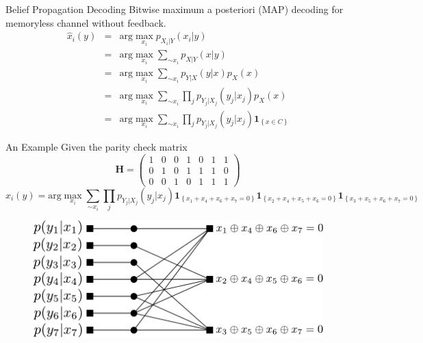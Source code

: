 \documentclass{beamer}
\begin{document}
  \begin{frame}{Belief Propagation Decoding}
  Bitwise maximum a posteriori (MAP) decoding for memoryless channel without feedback.
  \begin{eqnarray}
  \hat x_i( y) 	&=& \text{arg} \max_{x_i}p_{X_{i}|Y}(x_{i}| y) \label{eq:1}\\
		&=& \text{arg} \max_{x_i}\sum_{\sim x_i}p_{X|Y}( x| y) \label{eq:2}\\
		&=& \text{arg} \max_{x_i}\sum_{\sim x_i}p_{Y|X}( y| x)p_{X}( x) \label{eq:3}\\
		&=& \text{arg} \max_{x_i}\sum_{\sim x_i}\prod_{j}p_{Y_j|X_j}(y_j|x_j)p_{X}( x)\label{eq:4} \\
   		&=& \text{arg} \max_{x_i}\sum_{\sim x_i}\prod_{j}p_{Y_j|X_j}(y_j|x_j)\mathbf{1}_{\left\lbrace x\in C\right\rbrace} \label{eq:5}
  \end{eqnarray} 
  \end{frame}


  \begin{frame}{An Example}
   Given the parity check matrix
\begin{equation}
\label{H_matrix}
 \textbf{H} = 
 \left(
\begin{array}{ccccccc}
1 & 0 & 0 & 1 & 0 & 1 & 1  \\
0 & 1 & 0 & 1 & 1 & 1 & 0  \\
0 & 0 & 1 & 0 & 1 & 1 & 1 
\end{array}
\right)
\end{equation}
\fontsize{7pt}{7.2}\selectfont
\begin{equation}
\hat x_i(y) = \text{arg} \max_{x_i}\sum_{\sim x_i}\prod_{j}p_{Y_j|X_j}(y_j|x_j)\mathbf{1}_{\left\lbrace x_1 + x_4 + x_6 + x_7 = 0\right\rbrace}\mathbf{1}_{\left\lbrace x_2 + x_4 + x_5 + x_6 = 0\right\rbrace}\mathbf{1}_{\left\lbrace x_3 + x_5 + x_6 + x_7 = 0\right\rbrace} \label{eq:decoding_example}
\end{equation}
\begin{figure}[scale=0.5, !tp]
  \centering
  \includegraphics[scale=0.5]{factor_graph_channel}
\end{figure}
  \end{frame}
  
\end{document}
